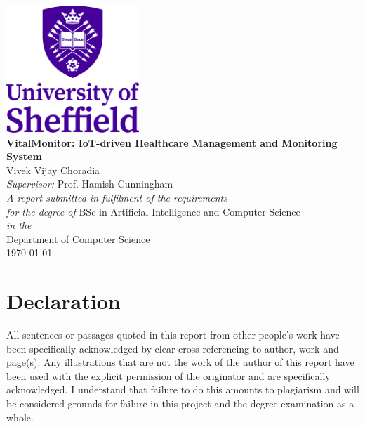 \documentclass[11pt,oneside]{book}
\begin{document}
\frontmatter

\begin{titlepage}


\begin{center}
\includegraphics[width=5cm]{images/UOSLogo_Portrait_Violet_RGB.png}\\[2cm]
\linespread{1.2}\huge {\bfseries VitalMonitor: IoT-driven Healthcare Management and Monitoring System}\\[2cm]
\linespread{1}
{\Large Vivek Vijay Choradia}\\[1cm]
{\large \emph{Supervisor:} Prof. Hamish Cunningham}\\[1cm]
\large \emph{A report submitted in fulfilment of the requirements}\\ \emph{for the degree of} BSc in Artificial Intelligence and Computer Science\\[0.3cm] 
\textit{in the}\\[0.3cm]
Department of Computer Science\\[2cm]
\today
\end{center}

\end{titlepage}


\newpage
\chapter*{\Large Declaration}


All sentences or passages quoted in this report from other people's work have been specifically acknowledged by clear cross-referencing to author, work and page(s). Any illustrations that are not the work of the author of this report have been used with the explicit permission of the originator and are specifically acknowledged. I understand that failure to do this amounts to plagiarism and will be considered grounds for failure in this project and the degree examination as a whole.\\[1cm]
\end{document}
